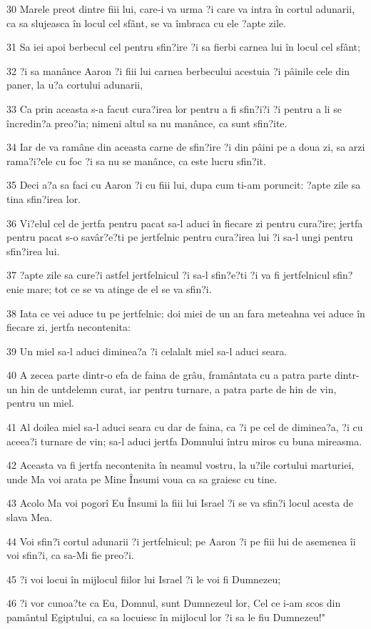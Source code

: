 \par 30 Marele preot dintre fiii lui, care-i va urma ?i care va intra în cortul adunarii, ca sa slujeasca în locul cel sfânt, se va îmbraca cu ele ?apte zile.
\par 31 Sa iei apoi berbecul cel pentru sfin?ire ?i sa fierbi carnea lui în locul cel sfânt;
\par 32 ?i sa manânce Aaron ?i fiii lui carnea berbecului acestuia ?i pâinile cele din paner, la u?a cortului adunarii,
\par 33 Ca prin aceasta s-a facut cura?irea lor pentru a fi sfin?i?i ?i pentru a li se încredin?a preo?ia; nimeni altul sa nu manânce, ca sunt sfin?ite.
\par 34 Iar de va ramâne din aceasta carne de sfin?ire ?i din pâini pe a doua zi, sa arzi rama?i?ele cu foc ?i sa nu se manânce, ca este lucru sfin?it.
\par 35 Deci a?a sa faci cu Aaron ?i cu fiii lui, dupa cum ti-am poruncit: ?apte zile sa tina sfin?irea lor.
\par 36 Vi?elul cel de jertfa pentru pacat sa-l aduci în fiecare zi pentru cura?ire; jertfa pentru pacat s-o savâr?e?ti pe jertfelnic pentru cura?irea lui ?i sa-l ungi pentru sfin?irea lui.
\par 37 ?apte zile sa cure?i astfel jertfelnicul ?i sa-l sfin?e?ti ?i va fi jertfelnicul sfin?enie mare; tot ce se va atinge de el se va sfin?i.
\par 38 Iata ce vei aduce tu pe jertfelnic: doi miei de un an fara meteahna vei aduce în fiecare zi, jertfa necontenita:
\par 39 Un miel sa-l aduci diminea?a ?i celalalt miel sa-l aduci seara.
\par 40 A zecea parte dintr-o efa de faina de grâu, framântata cu a patra parte dintr-un hin de untdelemn curat, iar pentru turnare, a patra parte de hin de vin, pentru un miel.
\par 41 Al doilea miel sa-l aduci seara cu dar de faina, ca ?i pe cel de diminea?a, ?i cu aceea?i turnare de vin; sa-l aduci jertfa Domnului întru miros cu buna mireasma.
\par 42 Aceasta va fi jertfa necontenita în neamul vostru, la u?ile cortului marturiei, unde Ma voi arata pe Mine Însumi voua ca sa graiesc cu tine.
\par 43 Acolo Ma voi pogorî Eu Însumi la fiii lui Israel ?i se va sfin?i locul acesta de slava Mea.
\par 44 Voi sfin?i cortul adunarii ?i jertfelnicul; pe Aaron ?i pe fiii lui de asemenea îi voi sfin?i, ca sa-Mi fie preo?i.
\par 45 ?i voi locui în mijlocul fiilor lui Israel ?i le voi fi Dumnezeu;
\par 46 ?i vor cunoa?te ca Eu, Domnul, sunt Dumnezeul lor, Cel ce i-am scos din pamântul Egiptului, ca sa locuiesc în mijlocul lor ?i sa le fiu Dumnezeu!"

